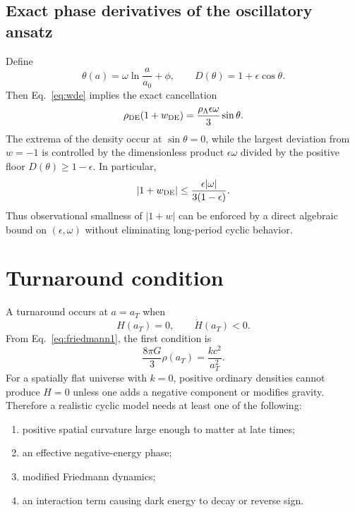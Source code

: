 \documentclass[11pt]{article}
\theoremstyle{remark}
\begin{document}
\subsection{Exact phase derivatives of the oscillatory ansatz}
Define
\begin{equation}
 \theta(a)=\omega\ln\frac{a}{a_0}+\phi,
 \qquad
 D(\theta)=1+\epsilon\cos\theta.
\end{equation}
Then Eq.~\eqref{eq:wde} implies the exact cancellation
\begin{equation}
 \rho_{\rm DE}(1+w_{\rm DE})
 =\frac{\rho_\Lambda\epsilon\omega}{3}\sin\theta.
 \label{eq:cyclic-rhop}
\end{equation}
The extrema of the density occur at $\sin\theta=0$, while the largest deviation from $w=-1$ is controlled by the dimensionless product $\epsilon\omega$ divided by the positive floor $D(\theta)\ge1-\epsilon$. In particular,
\begin{equation}
 |1+w_{\rm DE}|
 \le \frac{\epsilon|\omega|}{3(1-\epsilon)}.
 \label{eq:cyclic-w-bound}
\end{equation}
Thus observational smallness of $|1+w|$ can be enforced by a direct algebraic bound on $(\epsilon,\omega)$ without eliminating long-period cyclic behavior.


\section{Turnaround condition}
A turnaround occurs at $a=a_T$ when
\begin{equation}
    H(a_T)=0,
    \qquad
    \dot H(a_T)<0.
\end{equation}
From Eq.~\eqref{eq:friedmann1}, the first condition is
\begin{equation}
    \frac{8\pi G}{3}\rho(a_T)=\frac{kc^2}{a_T^2}.
\end{equation}
For a spatially flat universe with $k=0$, positive ordinary densities cannot produce $H=0$ unless one adds a negative component or modifies gravity. Therefore a realistic cyclic model needs at least one of the following:
\begin{enumerate}[leftmargin=2em]
    \item positive spatial curvature large enough to matter at late times;
    \item an effective negative-energy phase;
    \item modified Friedmann dynamics;
    \item an interaction term causing dark energy to decay or reverse sign.
\end{enumerate}
\end{document}

